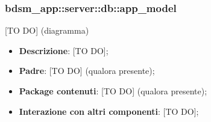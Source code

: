 
  \subsubsection{bdsm\_app::server::db::app\_model} %
  \label{ssub:bdsm_app_server_app_model}
  [TO DO] (diagramma) \newline \newline

  \begin{itemize}
  \item \textbf{Descrizione}: [TO DO];
  \item \textbf{Padre}: [TO DO] (qualora presente);
  \item \textbf{Package contenuti}: [TO DO] (qualora presente);
  \item \textbf{Interazione con altri componenti}: [TO DO];
  \end{itemize}

